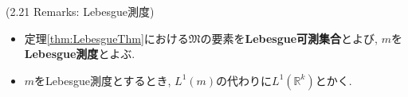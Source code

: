\documentclass[a4paper]{jsarticle}
\begin{document}
\begin{defi}{(2.21 Remarks: Lebesgue測度)}{}
    \begin{itemize}
        \item 定理\ref{thm:LebesgueThm}における$\mathfrak{M}$の要素を{\bf Lebesgue可測集合}とよび, $m$を{\bf Lebesgue測度}とよぶ.
        \item $m$をLebesgue測度とするとき, $L^1(m)$の代わりに$L^1(\mathbb{R}^k)$とかく.
    \end{itemize}
\end{defi}
\end{document}
